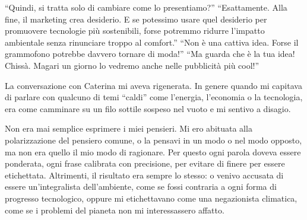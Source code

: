 \begin{dialogue}
 \enquote{Quindi,  si tratta solo di cambiare come lo presentiamo?}
 \enquote{Esattamente. Alla fine, il marketing crea desiderio. E se potessimo usare quel desiderio per promuovere tecnologie più sostenibili, forse potremmo ridurre l'impatto ambientale senza rinunciare troppo al comfort.}
 \enquote{Non è una cattiva idea. Forse il grammofono potrebbe davvero tornare di moda!}
 \enquote{Ma guarda che è la tua idea! Chissà. Magari un giorno lo vedremo anche nelle pubblicità più cool!}
\end{dialogue}
\begin{center}
\begin{minipage}{0.7\textwidth}
    \centering
    
\end{minipage}
\end{center}
La conversazione con Caterina mi aveva rigenerata. In genere quando mi capitava di parlare con qualcuno di temi ``caldi''  come l'energia, l'economia o la tecnologia, era come camminare su un filo sottile sospeso nel vuoto e mi sentivo a disagio.

Non era mai semplice esprimere i miei pensieri. Mi ero abituata alla polarizzazione del pensiero comune, o la pensavi in un modo o nel modo opposto, ma non era quello il mio modo di ragionare. Per questo ogni parola doveva essere ponderata, ogni frase calibrata con precisione, per evitare di finere per essere etichettata. Altrimenti, il risultato era sempre lo stesso: o venivo accusata di essere un'integralista dell'ambiente, come se fossi contraria a ogni forma di progresso tecnologico, oppure mi etichettavano come una negazionista climatica, come se i problemi del pianeta non mi interessassero affatto.


